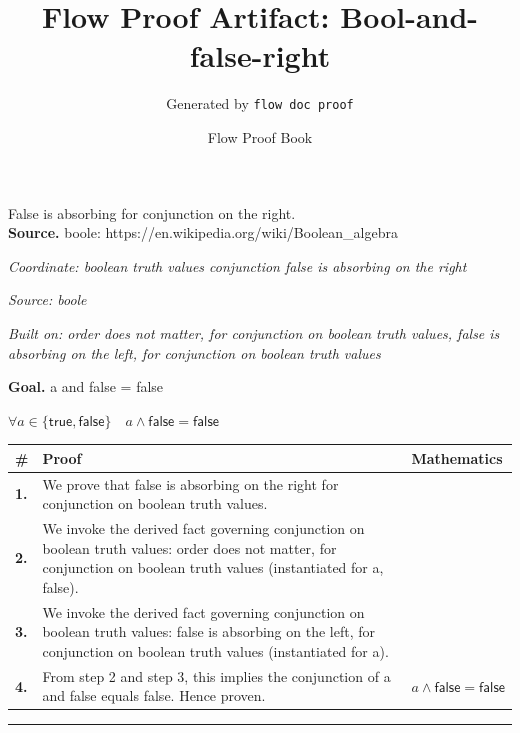 \documentclass[11pt]{article}
\title{Flow Proof Artifact: Bool-and-false-right}
\author{Generated by \texttt{flow doc proof}}
\date{Flow Proof Book}
\theoremstyle{definition}
\begin{document}
\maketitle
False is absorbing for conjunction on the right.\\[0.5em]
\textbf{Source.} boole: https://en.wikipedia.org/wiki/Boolean\_algebra\\[0.5em]
\bigskip
{}\par
\smallskip\noindent\textit{Coordinate: boolean truth values \cdot conjunction \cdot false is absorbing on the right}\par
\smallskip\noindent\textit{Source: boole}\par
\smallskip\noindent\textit{Built on: order does not matter, for conjunction on boolean truth values, false is absorbing on the left, for conjunction on boolean truth values}\par
\medskip
\noindent\textbf{Goal.} a and false = false\par
\noindent$\displaystyle \forall a \in \{\mathsf{true}, \mathsf{false}\}\quad a \land \mathsf{false} = \mathsf{false}$\par
\medskip
\noindent
\begin{tabular}{@{} >{\raggedright\arraybackslash}p{} >{\raggedright\arraybackslash}p{} >{\raggedleft\arraybackslash}p{} @{}}
\textbf{\#} & \textbf{Proof} & \textbf{Mathematics} \\
\midrule
\textbf{1.} & We prove that false is absorbing on the right for conjunction on boolean truth values. & \\[0.45em]
\textbf{2.} & We invoke the derived fact governing conjunction on boolean truth values: order does not matter, for conjunction on boolean truth values (instantiated for a, false). & \\[0.45em]
\textbf{3.} & We invoke the derived fact governing conjunction on boolean truth values: false is absorbing on the left, for conjunction on boolean truth values (instantiated for a). & \\[0.45em]
\textbf{4.} & From step 2 and step 3, this implies the conjunction of a and false equals false. Hence proven. & $\displaystyle a \land \mathsf{false} = \mathsf{false}$ \\[0.45em]
\bottomrule
\end{tabular}
\label{thm:Bool-conjunction-false_is_absorbing_on_the_right}
\par\medskip\hrule
\end{document}

